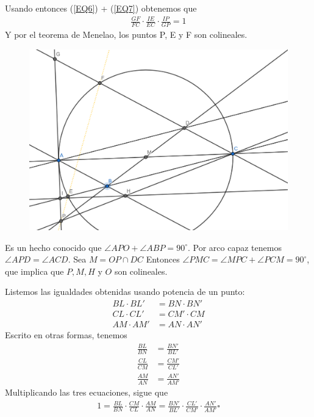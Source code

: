 \begin{sol}
	Usando entonces (\ref{EQ6}) + (\ref{EQ7}) obtenemos que
	\begin{align}
	\frac{GF}{FC} \cdot \frac{IE}{EC} \cdot \frac{IP}{GP} = 1 
	\end{align}
	Y por el teorema de Menelao, los puntos P, E y F son colineales.
	\begin{figure}[h!] 
		\centering
		\includegraphics[scale=0.4]{JT2.png}
	\end{figure}
\end{sol}

\begin{sol}
	Es un hecho conocido que $\angle{APO} + \angle{ABP} = 90^{\circ}$. Por arco capaz tenemos $\angle{APD} = \angle{ACD}$. Sea $M = OP \cap DC$ Entonces $\angle{PMC} = \angle{MPC} + \angle{PCM} = 90^{\circ}$, que implica que $P, M, H$ y $O$ son colineales. 
\end{sol}

\begin{sol}
	Listemos las igualdades obtenidas usando potencia de un punto:
	\begin{align}
	BL \cdot BL' &= BN \cdot BN' \\
	CL \cdot CL' &= CM' \cdot CM \\
	AM \cdot AM' & = AN \cdot AN' 
	\end{align}
	Escrito en otras formas, tenemos 
	\begin{align}
	\frac{BL}{BN}&= \frac{BN'}{BL'} \\
	\frac{CL}{CM}&= \frac{CM'}{CL'} \\
	\frac{AM}{AN}&= \frac{AN'}{AM'} 
	\end{align}
	Multiplicando las tres ecuaciones, sigue que
	\begin{align}
	1 = \frac{BL}{BN}\cdot \frac{CM}{CL} \cdot \frac{AM}{AN} = \frac{BN'}{BL'} \cdot \frac{CL'}{CM'} \cdot  \frac{AN'}{AM'}  \square
	\end{align}
\end{sol}

